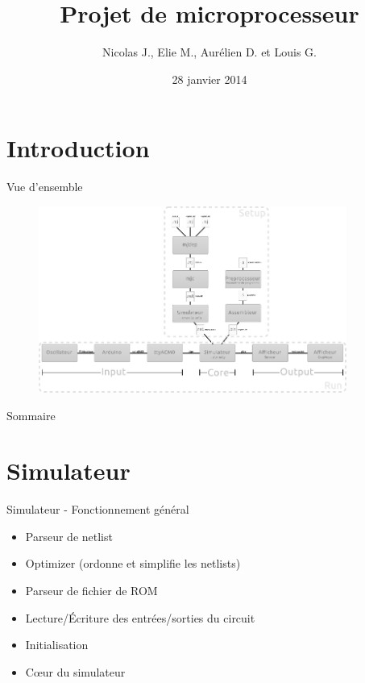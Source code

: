 \documentclass{beamer}
\title{Projet de microprocesseur}
\author{Nicolas J., Elie M., Aurélien D. et Louis G.}
\date{28 janvier 2014}
\begin{document}
\maketitle

\section*{Introduction}

\begin{frame}{Vue d'ensemble}
	\begin{figure}
		\centering
		\includegraphics[width=0.9\textwidth,height=0.9\textheight,keepaspectratio]{organisation}
	\end{figure}
\end{frame}

\begin{frame}{Sommaire}
	\tableofcontents
\end{frame}


\section{Simulateur}
\begin{frame}{Simulateur - Fonctionnement général}
	\begin{itemize}
		\item Parseur de netlist
		\item Optimizer (ordonne et simplifie les netlists)
		\item Parseur de fichier de ROM
		\item Lecture/Écriture des entrées/sorties du circuit
		\item Initialisation
		\item Cœur du simulateur
	\end{itemize}
\end{frame}
\end{document}
